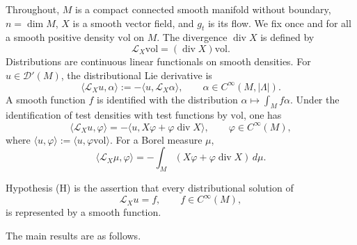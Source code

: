 \documentclass[12pt]{article}
\theoremstyle{definition}
\newcommand{\D}{\mathcal{D}}
\newcommand{\vol}{\mathrm{vol}}
\DeclareMathOperator{\Div}{div}
\begin{document}
Throughout, \(M\) is a compact connected smooth manifold without boundary, \(n=\dim M\), \(X\) is a smooth vector field, and \(g_t\) is its flow.  We fix once and for all a smooth positive density \(\vol\) on \(M\).  The divergence \(\Div X\) is defined by
\[
\mathcal L_X \vol=(\Div X)\vol .
\]
Distributions are continuous linear functionals on smooth densities.  For \(u\in \D'(M)\), the distributional Lie derivative is
\[
\langle \mathcal L_X u,\alpha\rangle :=-\langle u,\mathcal L_X\alpha\rangle,
\qquad \alpha\in C^\infty(M,|\Lambda|).
\]
A smooth function \(f\) is identified with the distribution \(\alpha\mapsto \int_M f\alpha\).  Under the identification of test densities with test functions by \(\vol\), one has
\[
\langle \mathcal L_X u,\varphi\rangle
=
-\langle u,X\varphi+\varphi\Div X\rangle,
\qquad \varphi\in C^\infty(M),
\]
where \(\langle u,\varphi\rangle:=\langle u,\varphi\vol\rangle\).  For a Borel measure \(\mu\),
\[
\langle \mathcal L_X\mu,\varphi\rangle
=
-\int_M (X\varphi+\varphi\Div X)\,d\mu .
\]

Hypothesis (H) is the assertion that every distributional solution of
\[
\mathcal L_X u=f,\qquad f\in C^\infty(M),
\]
is represented by a smooth function.

The main results are as follows.
\end{document}
